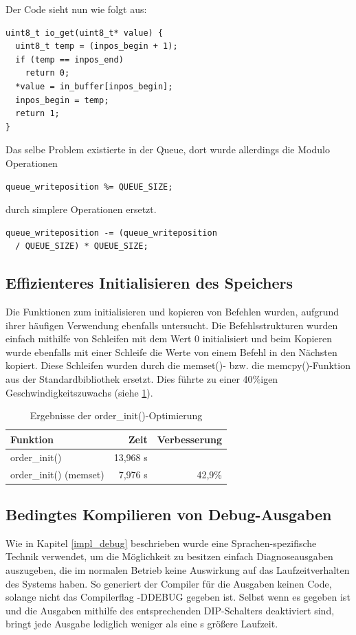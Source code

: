 Der Code sieht nun wie folgt aus:
\begin{verbatim}
uint8_t io_get(uint8_t* value) {
  uint8_t temp = (inpos_begin + 1);
  if (temp == inpos_end)
    return 0;
  *value = in_buffer[inpos_begin];
  inpos_begin = temp;
  return 1;
}
\end{verbatim}
Das selbe Problem existierte in der Queue, dort wurde allerdings die Modulo Operationen
\begin{verbatim}
queue_writeposition %= QUEUE_SIZE;
\end{verbatim}
durch simplere Operationen ersetzt.
\begin{verbatim}
queue_writeposition -= (queue_writeposition
  / QUEUE_SIZE) * QUEUE_SIZE;
\end{verbatim}
\subsection{Effizienteres Initialisieren des Speichers}
Die Funktionen zum initialisieren und kopieren von Befehlen wurden, aufgrund ihrer häufigen Verwendung ebenfalls
untersucht. Die Befehlsstrukturen wurden einfach mithilfe von Schleifen mit dem Wert 0 initialisiert und beim
Kopieren wurde ebenfalls mit einer Schleife die Werte von einem Befehl in den Nächsten kopiert. Diese Schleifen
wurden durch die memset()- bzw. die memcpy()-Funktion aus der Standardbibliothek ersetzt. Dies führte zu einer
40\%igen Geschwindigkeitszuwachs (siehe \ref{order_init_meas}).
\begin{table}[htb]
\begin{center}
	\begin{tabular}{|l||r|r|}
		\hline
		\textbf{Funktion} & \textbf{Zeit} & \textbf{Verbesserung} \\ \hline \hline
		order\_init() & 13,968 \textmu{}s & \\ \hline
		order\_init() (memset) & 7,976 \textmu{}s & 42,9\% \\ \hline
	\end{tabular}
	\caption{\label{order_init_meas} Ergebnisse der order\_init()-Optimierung}
\end{center}
\end{table}
\subsection{Bedingtes Kompilieren von Debug-Ausgaben}
Wie in Kapitel \ref{impl_debug} beschrieben wurde eine Sprachen-spezifische Technik verwendet, um 
die Möglichkeit zu besitzen einfach Diagnoseausgaben auszugeben, die im normalen Betrieb keine Auswirkung
auf das Laufzeitverhalten des Systems haben. So generiert der Compiler für die Ausgaben keinen Code, solange nicht
das Compilerflag -DDEBUG gegeben ist. Selbst wenn es gegeben ist und die Ausgaben mithilfe des entsprechenden DIP-Schalters
deaktiviert sind, bringt jede Ausgabe lediglich weniger als eine \textmu{}s größere Laufzeit.

